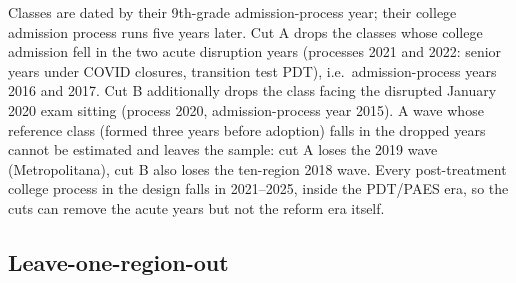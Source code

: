 \documentclass[
]{article}
\begin{document}
Classes are dated by their 9th-grade admission-process year; their
college admission process runs five years later. Cut A drops the classes
whose college admission fell in the two acute disruption years
(processes 2021 and 2022: senior years under COVID closures, transition
test PDT), i.e.~admission-process years 2016 and 2017. Cut B
additionally drops the class facing the disrupted January 2020 exam
sitting (process 2020, admission-process year 2015). A wave whose
reference class (formed three years before adoption) falls in the
dropped years cannot be estimated and leaves the sample: cut A loses the
2019 wave (Metropolitana), cut B also loses the ten-region 2018 wave.
Every post-treatment college process in the design falls in 2021--2025,
inside the PDT/PAES era, so the cuts can remove the acute years but not
the reform era itself.

\begin{table}[htbp]
   \caption{Robustness: COVID and Exam-Reform Window Cuts}\label{tab: covid cuts}
   \centerline{}
\end{table}

\hypertarget{leave-one-region-out}{%
\subsection{Leave-one-region-out}\label{leave-one-region-out}}
\end{document}
